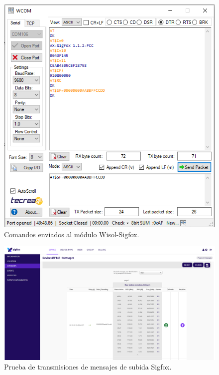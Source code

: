 \begin{figure}[H]
	\centering
	\includegraphics[scale=.5]{./Figures/COMANDOSATSIGFOX.PNG}
	\caption{Comandos enviados al módulo Wisol-Sigfox.}
	\label{fig:COMANDOSATSIGFOX}
\end{figure}
\begin{figure}[H]
	\centering
	\includegraphics[scale=.35]{./Figures/tRANSMISIONsIGFOX.PNG}
	\caption{Prueba de transmisiones de mensajes de subida Sigfox.}
	\label{fig:tRANSMISIONsIGFOX}
\end{figure}

